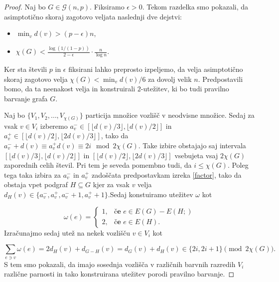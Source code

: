 \documentclass[12pt,a4paper,twoside]{article}
\theoremstyle{definition} %
\theoremstyle{plain} %
\numberwithin{equation}{section}  %
\begin{document}
\begin{proof}
Naj bo $G \in \mathcal{G}(n,p)$. Fiksiramo $\epsilon > 0$. Tekom razdelka smo pokazali, da asimptotično skoraj zagotovo veljata naslednji dve dejstvi:
\begin{itemize}
\item $\min_v d(v) > (p- \epsilon)n$,

\item $\chi(G) < \frac{\log(1/(1-p))}{2 - \epsilon} \cdot \frac{ n}{\log n}.$
\end{itemize}
Ker sta števili $p$ in $\epsilon$ fiksirani lahko preprosto izpeljemo, da velja asimptotično skoraj zagotovo velja $ \chi(G) < \min_vd(v) / 6$ za dovolj velik $n$. Predpostavili bomo, da ta neenakost velja in konstruirali $2$-utežitev, ki bo tudi pravilno barvanje grafa $G$.

Naj bo $\{ V_1, V_2, \ldots, V_{\chi(G)}\}$ particija množice vozlišč v neodvisne množice. Sedaj za vsak $v \in V_i$ izberemo $a_v^- \in [ \lfloor d(v)/3 \rfloor,\lfloor d(v)/2 \rfloor]$ in $a_v^+ \in [ \lfloor d(v)/2 \rfloor,\lfloor 2d(v)/3 \rfloor]$, tako da $a_v^- + d(v) \equiv a_v^+  d(v) \equiv 2i \mod 2\chi(G)$. Take izbire obstajajo saj intervala $ [ \lfloor d(v)/3 \rfloor,\lfloor d(v)/2 \rfloor]$ in $ [ \lfloor d(v)/2 \rfloor,\lfloor 2d(v)/3 \rfloor]$ vsebujeta vsaj $2\chi(G)$ zaporednih celih števil. Pri tem je seveda pomembno tudi, da $i \le \chi(G)$. Poleg tega taka izbira za $a_v^-$ in $a_v^+$ zadoščata predpostavkam izreka \ref{factor}, tako da obstaja vpet podgraf $H \subseteq G$ kjer za vsak $v$ velja $d_H(v) \in \{a_v^-,a_v^+,a_v^- + 1 ,a_v^+ + 1\}$.Sedaj konstuiramo utežitev $\omega$ kot 

$$ \omega(e) = \begin{cases}
	1, & \textbf{če } e \in E(G) - E(H;)\\ 
	2, &\textbf{če } e \in E(H) .
	\end{cases} $$
Izračunajmo sedaj utež na nekek vozlišču $v \in V_i$ kot

$$ \sum_{e \ni v} \omega(e) = 2 d_H(v) + d_{G-H}(v) = d_{G}(v) + d_H(v) \in \{2i, 2i + 1\} \pmod{2\chi(G)}.$$
S tem smo pokazali, da imajo sosednja vozlišča v različnih barvnih razredih $V_i$ različne parnosti in tako konstruirana utežitev porodi pravilno barvanje.
\end{proof}
\end{document}
